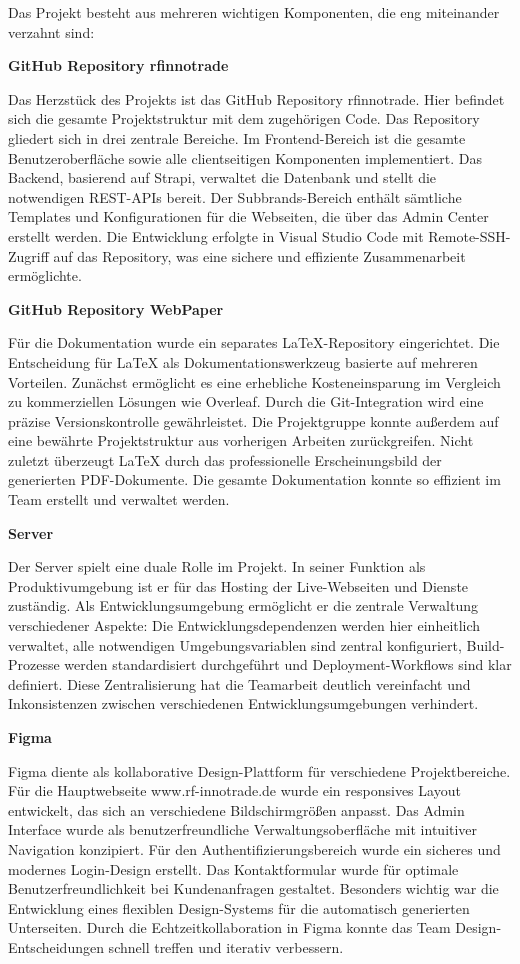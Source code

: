 Das Projekt besteht aus mehreren wichtigen Komponenten, die eng miteinander verzahnt sind:

\textbf{GitHub Repository rfinnotrade}

Das Herzstück des Projekts ist das GitHub Repository rfinnotrade. Hier befindet sich die gesamte Projektstruktur mit dem zugehörigen Code. Das Repository gliedert sich in drei zentrale Bereiche. Im Frontend-Bereich ist die gesamte Benutzeroberfläche sowie alle clientseitigen Komponenten implementiert. Das Backend, basierend auf Strapi, verwaltet die Datenbank und stellt die notwendigen REST-APIs bereit. Der Subbrands-Bereich enthält sämtliche Templates und Konfigurationen für die Webseiten, die über das Admin Center erstellt werden. Die Entwicklung erfolgte in Visual Studio Code mit Remote-SSH-Zugriff auf das Repository, was eine sichere und effiziente Zusammenarbeit ermöglichte.

\textbf{GitHub Repository WebPaper}

Für die Dokumentation wurde ein separates LaTeX-Repository eingerichtet. Die Entscheidung für LaTeX als Dokumentationswerkzeug basierte auf mehreren Vorteilen. Zunächst ermöglicht es eine erhebliche Kosteneinsparung im Vergleich zu kommerziellen Lösungen wie Overleaf. Durch die Git-Integration wird eine präzise Versionskontrolle gewährleistet. Die Projektgruppe konnte außerdem auf eine bewährte Projektstruktur aus vorherigen Arbeiten zurückgreifen. Nicht zuletzt überzeugt LaTeX durch das professionelle Erscheinungsbild der generierten PDF-Dokumente. Die gesamte Dokumentation konnte so effizient im Team erstellt und verwaltet werden.

\textbf{Server}

Der Server spielt eine duale Rolle im Projekt. In seiner Funktion als Produktivumgebung ist er für das Hosting der Live-Webseiten und Dienste zuständig. Als Entwicklungsumgebung ermöglicht er die zentrale Verwaltung verschiedener Aspekte: Die Entwicklungsdependenzen werden hier einheitlich verwaltet, alle notwendigen Umgebungsvariablen sind zentral konfiguriert, Build-Prozesse werden standardisiert durchgeführt und Deployment-Workflows sind klar definiert. Diese Zentralisierung hat die Teamarbeit deutlich vereinfacht und Inkonsistenzen zwischen verschiedenen Entwicklungsumgebungen verhindert.

\textbf{Figma}

Figma diente als kollaborative Design-Plattform für verschiedene Projektbereiche. Für die Hauptwebseite www.rf-innotrade.de wurde ein responsives Layout entwickelt, das sich an verschiedene Bildschirmgrößen anpasst. Das Admin Interface wurde als benutzerfreundliche Verwaltungsoberfläche mit intuitiver Navigation konzipiert. Für den Authentifizierungsbereich wurde ein sicheres und modernes Login-Design erstellt. Das Kontaktformular wurde für optimale Benutzerfreundlichkeit bei Kundenanfragen gestaltet. Besonders wichtig war die Entwicklung eines flexiblen Design-Systems für die automatisch generierten Unterseiten. Durch die Echtzeitkollaboration in Figma konnte das Team Design-Entscheidungen schnell treffen und iterativ verbessern.